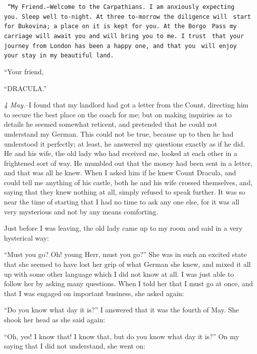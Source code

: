 \documentclass[12pt,openright]{book}
\begin{document}
\texttt{ “My Friend.--Welcome to the Carpathians. I am anxiously expecting}
\texttt{ you. Sleep well to-night. At three to-morrow the diligence will}
\texttt{ start for Bukovina; a place on it is kept for you. At the Borgo}
\texttt{ Pass my carriage will await you and will bring you to me. I trust}
\texttt{ that your journey from London has been a happy one, and that you}
\texttt{ will enjoy your stay in my beautiful land.}

“Your friend,

“DRACULA.”

\textit{4 May.}–I found that my landlord had got a letter from the Count, directing him to secure the best place on the coach for me; but on making inquiries as to details he seemed somewhat reticent, and pretended that he could not understand my German. This could not be true, because up to then he had understood it perfectly; at least, he answered my questions exactly as if he did. He and his wife, the old lady who had received me, looked at each other in a frightened sort of way. He mumbled out that the money had been sent in a letter, and that was all he knew. When I asked him if he knew Count Dracula, and could tell me anything of his castle, both he and his wife crossed themselves, and, saying that they knew nothing at all, simply refused to speak further. It was so near the time of starting that I had no time to ask any one else, for it was all very mysterious and not by any means comforting.

Just before I was leaving, the old lady came up to my room and said in a very hysterical way:

“Must you go? Oh! young Herr, must you go?” She was in such an excited state that she seemed to have lost her grip of what German she knew, and mixed it all up with some other language which I did not know at all. I was just able to follow her by asking many questions. When I told her that I must go at once, and that I was engaged on important business, she asked again:

“Do you know what day it is?” I answered that it was the fourth of May. She shook her head as she said again:

“Oh, yes! I know that! I know that, but do you know what day it is?” On my saying that I did not understand, she went on:
\end{document}
